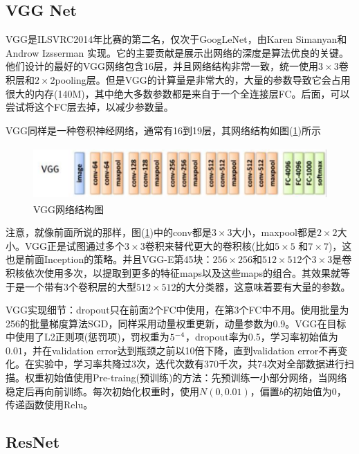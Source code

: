     \subsection{VGG Net}
        \par
        VGG是ILSVRC2014年比赛的第二名，仅次于GoogLeNet，由Karen Simanyan和Androw Izsserman 实现\cite{2014.KarenSzegedy}。它的主要贡献是展示出网络的深度是算法优良的关键。他们设计的最好的VGG网络包含16层，并且网络结构非常一致，统一使用$3\times 3$卷积层和$2\times 2$pooling层。但是VGG的计算量是非常大的，大量的参数导致它会占用很大的内存(140M)，其中绝大多数参数都是来自于一个全连接层FC。后面，可以尝试将这个FC层去掉，以减少参数量。
        \par
        VGG同样是一种卷积神经网络，通常有16到19层，其网络结构如图(\ref{fig:VGG网络结构图})所示
             \begin{figure}[H]
            \centering
            \includegraphics[height=2cm]{images/VGG_Net_structure.jpg}
            \caption{VGG网络结构图}
            \label{fig:VGG网络结构图}
            \end{figure}
        \par
        注意，就像前面所说的那样，图(\ref{fig:VGG网络结构图})中的conv都是$3\times 3$大小，maxpool都是$2\times 2$大小。VGG正是试图通过多个$3\times 3$卷积来替代更大的卷积核(比如$5\times 5$ 和$7\times 7$)，这也是前面Inception的策略。并且VGG-E第45块：$256\times 256$和$512\times 512$个$3\times 3$是卷积核依次使用多次，以提取到更多的特征maps以及这些maps的组合。其效果就等于是一个带有3个卷积层的大型$512\times 512$的大分类器，这意味着要有大量的参数。
        \par
        VGG实现细节：dropout只在前面2个FC中使用，在第3个FC中不用。使用批量为256的批量梯度算法SGD，同样采用动量权重更新，动量参数为0.9。VGG在目标中使用了L2正则项(惩罚项)，罚权重为$5\time 10^{-4}$，dropout率为0.5，学习率初始值为$0.01$，并在validation error达到瓶颈之前以10倍下降，直到validation error不再变化。在实验中，学习率共降过3次，迭代次数有370千次，共74次对全部数据进行扫描。权重初始值使用Pre-traing(预训练)的方法：先预训练一小部分网络，当网络稳定后再向前训练。每次初始化权重时，使用$N(0,0.01)$，偏置$b$的初始值为0，传递函数使用Relu。

    \subsection{ResNet}
